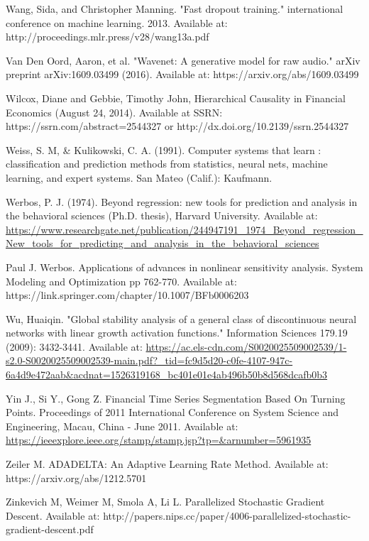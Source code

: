 \documentclass[a4paper,11pt,oneside]{article}
\theoremstyle{plain}
\theoremstyle{definition}
\begin{document}
\begin{thebibliography}{bibliography}
Wang, Sida, and Christopher Manning. "Fast dropout training." international conference on machine learning. 2013.
Available at: http://proceedings.mlr.press/v28/wang13a.pdf

Van Den Oord, Aaron, et al. "Wavenet: A generative model for raw audio." arXiv preprint arXiv:1609.03499 (2016).
Available at: https://arxiv.org/abs/1609.03499

Wilcox, Diane and Gebbie, Timothy John, Hierarchical Causality in Financial Economics (August 24, 2014). Available at SSRN: https://ssrn.com/abstract=2544327 or http://dx.doi.org/10.2139/ssrn.2544327

Weiss, S. M, \& Kulikowski, C. A. (1991). Computer systems that learn : classification and prediction methods from statistics, neural nets, machine learning, and expert systems. San Mateo (Calif.): Kaufmann.

Werbos, P. J. (1974). Beyond regression: new tools for prediction and analysis in the behavioral sciences (Ph.D. thesis), Harvard 
University. Available at: \url{https://www.researchgate.net/publication/244947191_1974_Beyond_regression_New_tools_for_predicting_and_analysis_in_the_behavioral_sciences}

Paul J. Werbos. Applications of advances in nonlinear sensitivity analysis. 
System Modeling and Optimization pp 762-770. Available at: https://link.springer.com/chapter/10.1007/BFb0006203

Wu, Huaiqin. "Global stability analysis of a general class of discontinuous neural networks with linear growth activation functions." Information Sciences 179.19 (2009): 3432-3441.
Available at: \url{https://ac.els-cdn.com/S0020025509002539/1-s2.0-S0020025509002539-main.pdf?_tid=fc9d5d20-c0fe-4107-947c-6a4d9e472aab&acdnat=1526319168_bc401e01e4ab496b50b8d568dcafb0b3}

Yin J., Si Y., Gong Z. Financial Time Series Segmentation Based On Turning 
Points. Proceedings of 2011 International Conference on System Science and Engineering, Macau, China - June 
2011. Available at: \url{https://ieeexplore.ieee.org/stamp/stamp.jsp?tp=&arnumber=5961935}

Zeiler M. ADADELTA: An Adaptive Learning Rate Method. Available at: https://arxiv.org/abs/1212.5701

Zinkevich M, Weimer M, Smola A, Li L. Parallelized Stochastic Gradient Descent. 
Available at: 
http://papers.nips.cc/paper/4006-parallelized-stochastic-gradient-descent.pdf


\end{thebibliography}
\end{document}
